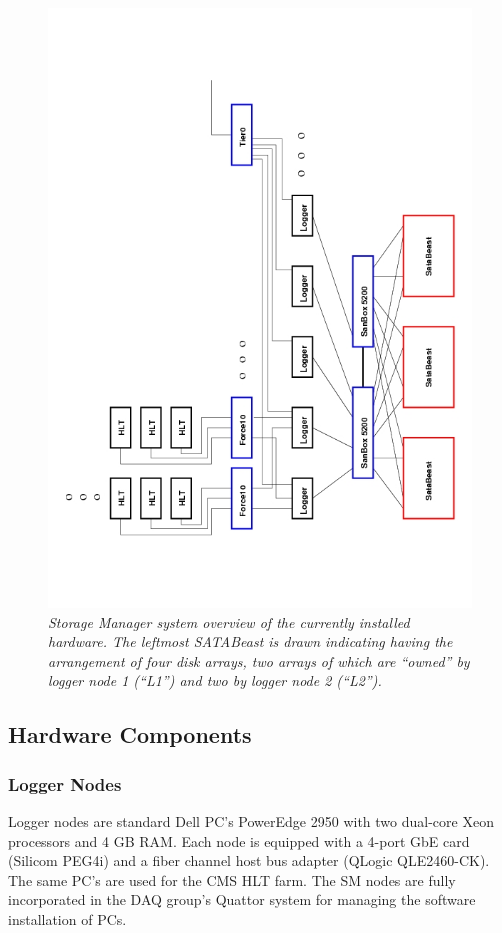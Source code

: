 \begin{figure}[tbh]
\begin{center}  
\includegraphics[width=1.0\textwidth]{Hardware/SMsystem}
\caption{\emph{ Storage Manager system overview of the currently installed hardware. 
The leftmost SATABeast is drawn indicating having the arrangement of four disk arrays, 
two arrays of which are ``owned'' by logger node 1 (``L1'') and two by logger node 2 (``L2'').}}
\label{fig:system}
\end{center}
\end{figure}  


\subsection{Hardware Components}
\subsubsection{Logger Nodes}
Logger nodes are standard Dell PC's PowerEdge 2950 with two dual-core Xeon processors and 4 GB RAM. 
Each node is equipped with a 4-port GbE card (Silicom PEG4i) and 
a fiber channel host bus adapter (QLogic QLE2460-CK). 
The same PC's are used for the CMS HLT farm.
The SM nodes are fully incorporated in the DAQ group's Quattor system for managing 
the software installation of PCs.

